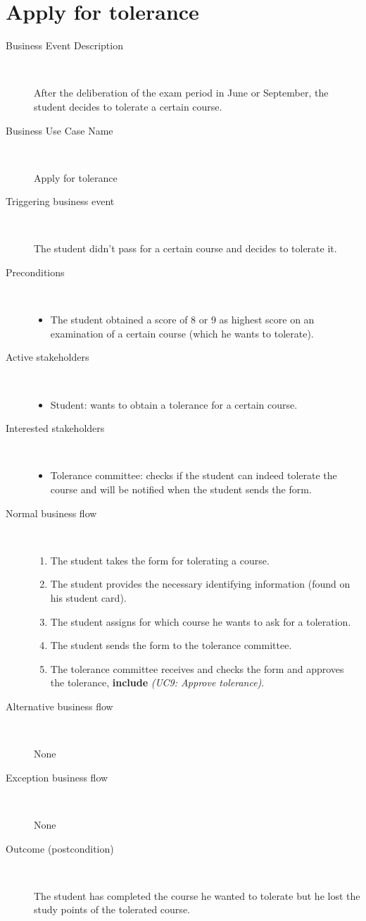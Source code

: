 \section{Apply for tolerance}

\begin{description}
	\item[Business Event Description] \ 
		\par After the deliberation of the exam period in June or September,
		the student decides to tolerate a certain course. 
	\item[Business Use Case Name] \ 
		\par Apply for tolerance
	\item[Triggering business event] \ 
		\par The student didn't pass for a certain course and decides to tolerate it.
	\item[Preconditions] \
	\begin{itemize}
		\item The student obtained a score of 8 or 9 as highest score on an
		examination of a certain course (which he wants to tolerate).
	\end{itemize}
	\item[Active stakeholders] \ 
	\begin{itemize}
		\item Student: wants to obtain a tolerance for a certain course.
	\end{itemize}
	\item[Interested stakeholders] \ 
		\begin{itemize}
		\item Tolerance committee: checks if the student can indeed tolerate the
		course and will be notified when the student sends the form.
		\end{itemize}
	\item[Normal business flow] \ 
	\begin{enumerate}
	  	\item The student takes the form for tolerating a course.
	  	\item The student provides the necessary identifying information (found on
	  	his student card).
	  	\item The student assigns for which course he wants to ask for a toleration.
	  	\item The student sends the form to the tolerance committee.
	  	\item The tolerance committee receives and checks the form and approves the
	  	tolerance, \textbf{include} \emph{(UC9: Approve tolerance)}.
	\end{enumerate}
	\item[Alternative business flow] \ 
		\par None
	\item[Exception business flow] \ 
		\par None
	\item[Outcome (postcondition)] \ 
		\par The student has completed the course he wanted to tolerate but he lost
		the study points of the tolerated course.
\end{description}
